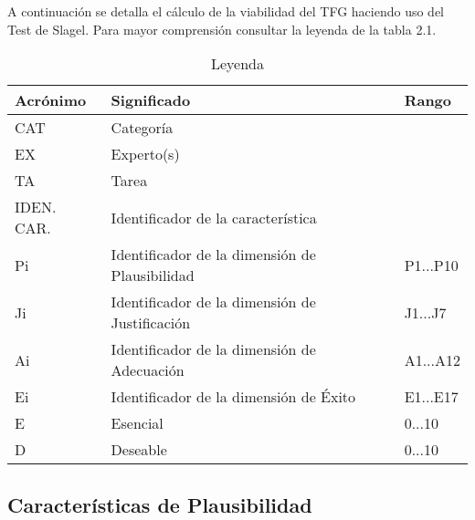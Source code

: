 A continuación se detalla el cálculo de la viabilidad del TFG haciendo uso del Test de Slagel.
Para mayor comprensión consultar la leyenda de la tabla 2.1.

\begin{table}[]
  \centering
  \caption{Leyenda}
  \label{tab:Leyenda}
  \begin{tabular}{|l|l|l|}
    \hline
    Acrónimo & Significado & Rango \\ \hline
    CAT & Categoría &  \\ \hline
    EX & Experto(s) &  \\ \hline
    TA & Tarea &  \\ \hline
    IDEN. CAR. & Identificador de la característica &  \\ \hline
    Pi & Identificador de la dimensión de Plausibilidad & P1...P10 \\ \hline
    Ji & Identificador de la dimensión de Justificación & J1...J7 \\ \hline
    Ai & Identificador de la dimensión de Adecuación & A1...A12 \\ \hline
    Ei & Identificador de la dimensión de Éxito & E1...E17 \\ \hline
    E & Esencial & 0...10 \\ \hline
    D & Deseable & 0...10 \\ \hline
  \end{tabular}
\end{table}








\subsection{Características de Plausibilidad}

